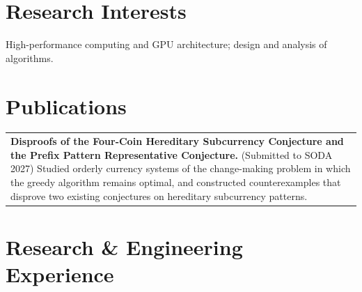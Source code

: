 

\section{Research Interests}
High-performance computing and GPU architecture; design and analysis of algorithms.


\section{Publications}
\begin{tabularx}{\linewidth}{@{}X@{}}
\textbf{Disproofs of the Four-Coin Hereditary Subcurrency Conjecture and the Prefix Pattern Representative Conjecture.} \normalsize (Submitted to SODA 2027) Studied orderly currency systems of the change-making problem in which the greedy algorithm remains optimal, and constructed counterexamples that disprove two existing conjectures on hereditary subcurrency patterns. \\
\end{tabularx}


\section{Research \& Engineering Experience}

